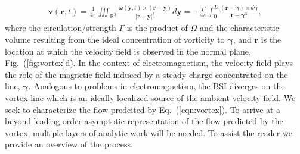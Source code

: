 \documentclass[aps,graphicx,reprint,onecolumn,12pt,tightenlines,longbibliography]{revtex4-1}
\newcommand{\sas}[2]{{#2}}
\begin{document}
%
\begin{align}\label{eqn:vortex}
 \bm{v}(\textbf{r},t) = \frac{1}{4\pi} \iiint_{\mathbb{R}^{3}} \frac{\bm{\omega}(\bm{y},t) \times (\textbf{r}-\bm{y})}{|\textbf{r}-\textbf{y}|^{3}}d\bm{y} = - \frac{\Gamma}{4\pi} \int_{0}^{L} \frac{(\textbf{r}-\bm{\gamma})\times d \bm{\gamma}}{|\textbf{r}-\bm{\gamma}^{3}|},
\end{align}
%
where the circulation/strength $\Gamma$ is the product of $\Omega$ and the characteristic volume resulting from the ideal concentration of vorticity to $\bm{\gamma}$\sas{}{,} and $\textbf{r}$ is the location at which the velocity field is observed in the normal plane, Fig.~(\ref{fig:vortex}d). \sas{}{In the context of electromagnetism, the velocity field plays the role of the magnetic field induced by a steady charge concentrated on the line, $\bm{\gamma}$.} Analogous to problems in electromagnetism, the BSI diverges on the vortex line which is an ideally localized source of the ambient velocity field.  \sas{}{We seek to characterize the flow predcited by Eq.~(\ref{eqn:vortex}). To arrive at a beyond leading order asymptotic representation of the flow predicted by the vortex, multiple layers of analytic work will be needed. To assist the reader we provide an overview of the process.} 
\end{document}
